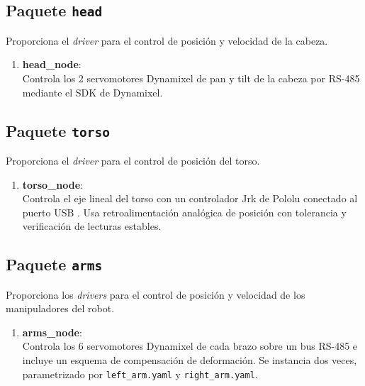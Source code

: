 \subsection{Paquete \texttt{head}}

Proporciona el \textit{driver} para el control de posición y velocidad de la cabeza.

\begin{enumerate}

\item \textbf{head\_node}: \\
Controla los 2 servomotores Dynamixel de pan y tilt de la cabeza por RS-485 mediante el SDK de Dynamixel.

\end{enumerate}

\subsection{Paquete \texttt{torso}}

Proporciona el \textit{driver} para el control de posición del torso.

\begin{enumerate}

\item \textbf{torso\_node}: \\
Controla el eje lineal del torso con un controlador Jrk de Pololu conectado al puerto USB . Usa retroalimentación analógica de posición con tolerancia y verificación de lecturas estables.

\end{enumerate}

\subsection{Paquete \texttt{arms}}

Proporciona los \textit{drivers} para el control de posición y velocidad de los manipuladores del robot.

\begin{enumerate}

\item \textbf{arms\_node}: \\
Controla los 6 servomotores Dynamixel de cada brazo sobre un bus RS-485 e incluye un esquema de compensación de deformación. Se instancia dos veces, parametrizado por \texttt{left\_arm.yaml} y \texttt{right\_arm.yaml}.

\end{enumerate}

